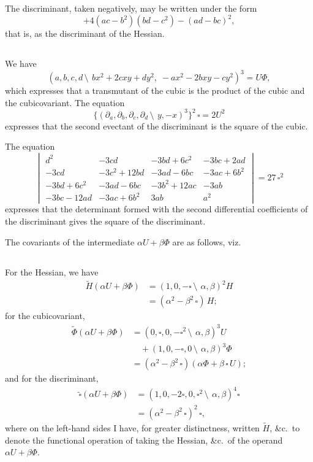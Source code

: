 \documentclass[12pt,a4paper]{article}
\begin{document}
The discriminant, taken negatively, may be written under the form
\[
+4(ac - b^2)(bd - c^2) - (ad - bc)^2,
\]
that is, as the discriminant of the Hessian.

\subsection{}

We have
\[
(a, b, c, d\,\setminus\!\!\:\, bx^2 + 2cxy + dy^2,\; -ax^2 - 2bxy - cy^2)^3 = U\Phi,
\]
which expresses that a transmutant of the cubic is the product of the cubic and the cubicovariant. The equation
\[
\{(\partial_a, \partial_b, \partial_c, \partial_d\,\setminus\!\!\:\, y, -x)^3\}^2\,\square = 2U^2
\]
expresses that the second evectant of the discriminant is the square of the cubic.

The equation
\[
\begin{vmatrix}
d^2 & -3cd & -3bd + 6c^2 & -3bc + 2ad \\
-3cd & -3c^2 + 12bd & -3ad - 6bc & -3ac + 6b^2 \\
-3bd + 6c^2 & -3ad - 6bc & -3b^2 + 12ac & -3ab \\
-3bc - 12ad & -3ac + 6b^2 & 3ab & a^2
\end{vmatrix}
= 27\,\square^2
\]
expresses that the determinant formed with the second differential coefficients of the discriminant gives the square of the discriminant.

The covariants of the intermediate $\alpha U + \beta\Phi$ are as follows, viz.

\subsection{}

For the Hessian, we have
\begin{align*}
\tilde{H}(\alpha U + \beta\Phi) &= (1, 0, -\square\,\setminus\!\!\:\, \alpha, \beta)^2 H\\
&= (\alpha^2 - \beta^2\,\square)\,H;
\end{align*}
for the cubicovariant,
\begin{align*}
\tilde{\Phi}(\alpha U + \beta\Phi) &= (0, \square, 0, -\square^2\,\setminus\!\!\:\, \alpha, \beta)^3 U\\
&\quad + (1, 0, -\square, 0\,\setminus\!\!\:\, \alpha, \beta)^3 \Phi\\
&= (\alpha^2 - \beta^2\,\square)(\alpha\Phi + \beta\,\square\,U);
\end{align*}
and for the discriminant,
\begin{align*}
\tilde{\square}(\alpha U + \beta\Phi) &= (1, 0, -2\square, 0, \square^2\,\setminus\!\!\:\, \alpha, \beta)^4 \square\\
&= (\alpha^2 - \beta^2\,\square)^2\,\square,
\end{align*}
where on the left-hand sides I have, for greater distinctness, written $\tilde{H}$, \&c.\ to denote the functional operation of taking the Hessian, \&c.\ of the operand $\alpha U + \beta\Phi$.
\end{document}

